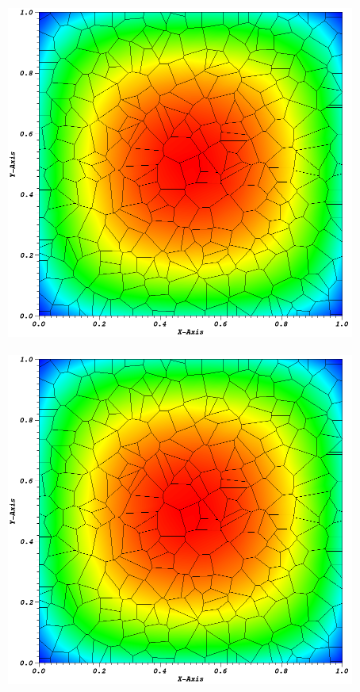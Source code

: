 \documentclass[11pt]{article}
\begin{document}
\begin{figure}
\centering
	\begin{subfigure}[b]{0.48\textwidth}
		\centering
		\includegraphics[width=\textwidth]{figures/poly_flux_Wachspress.png}
		\caption{}
	\end{subfigure}
	\hfill
	\begin{subfigure}[b]{0.48\textwidth}
		\centering
		\includegraphics[width=\textwidth]{figures/poly_flux_MV.png}
		\caption{}
	\end{subfigure}
	

\end{figure}
\end{document}
